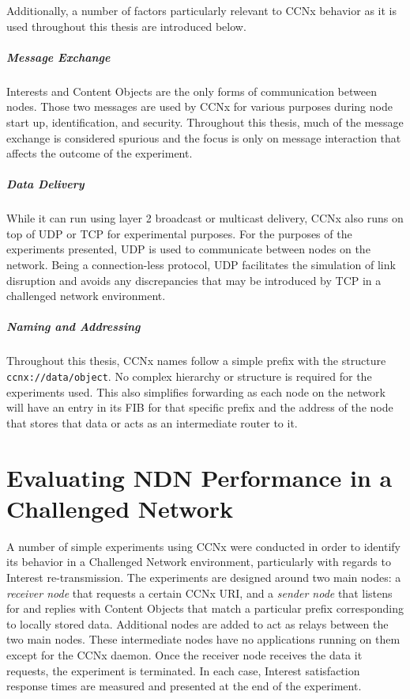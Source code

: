 \documentclass[a4paper,12pt]{report}      %
\begin{document}
\noindent Additionally, a number of factors particularly relevant to CCNx behavior as it is used throughout this thesis are introduced below.

\paragraph{Message Exchange} Interests and Content Objects are the only forms of communication between nodes.
Those two messages are used by CCNx for various purposes during node start up, identification, and security. Throughout this thesis, much of the message exchange is considered spurious and the focus is only on message interaction that affects the outcome of the experiment. 

\paragraph{Data Delivery} While it can run using layer 2 broadcast or multicast delivery, CCNx also
runs on top of UDP or TCP for experimental purposes. For the purposes of the experiments presented, UDP is used to
communicate between nodes on the network. Being a connection-less protocol, UDP facilitates the simulation of link disruption and avoids any discrepancies that may be introduced by TCP in a challenged network environment. 

\paragraph{Naming and Addressing} Throughout this thesis, CCNx names follow a simple prefix with the structure \verb!ccnx://data/object!. No complex hierarchy or structure is required for the experiments used. This also simplifies forwarding as each
node on the network will have an entry in its FIB for that specific prefix and the address of the node
that stores that data or acts as an intermediate router to it.


\pagebreak
\chapter{Evaluating NDN Performance in a Challenged Network}

A number of simple experiments using CCNx were conducted in order to identify its behavior in a Challenged Network environment, particularly with regards to Interest re-transmission. The experiments are designed around two main nodes: a \emph{receiver node} that requests a certain CCNx URI, and a \emph{sender node} that listens for and replies with Content Objects that match a particular prefix corresponding to locally stored data. Additional nodes are added to act as relays between the two main nodes. These intermediate nodes have no applications running on them except for the CCNx daemon. Once the receiver node receives the data it requests, the experiment is terminated. In each case, Interest satisfaction response times are measured and presented at the end of the experiment.
\end{document}

